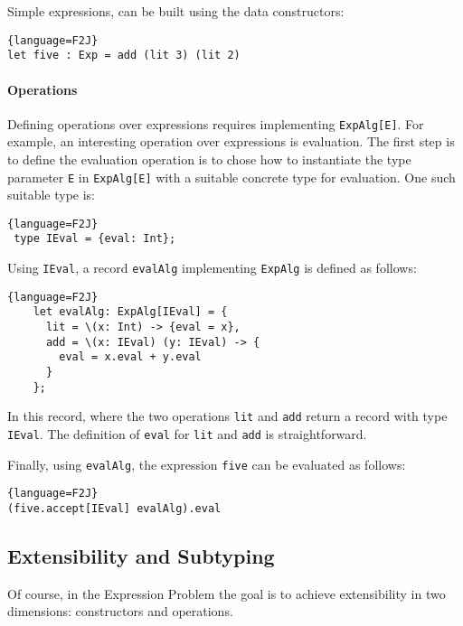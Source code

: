 Simple expressions, can be built using the data constructors:

\begin{lstlisting}{language=F2J}
let five : Exp = add (lit 3) (lit 2)
\end{lstlisting}

\paragraph{Operations} Defining operations over expressions requires
implementing \lstinline{ExpAlg[E]}. For example, an interesting
operation over expressions is evaluation. The first step is to define
the evaluation operation is to chose how to instantiate the type
parameter \lstinline{E} in \lstinline{ExpAlg[E]} with a suitable
concrete type for evaluation. One such suitable type is:

\begin{lstlisting}{language=F2J}
 type IEval = {eval: Int};
\end{lstlisting}

\noindent Using \lstinline{IEval}, a record \lstinline{evalAlg}
implementing \lstinline{ExpAlg} is defined as follows:

\begin{lstlisting}{language=F2J}
    let evalAlg: ExpAlg[IEval] = {
      lit = \(x: Int) -> {eval = x},
      add = \(x: IEval) (y: IEval) -> {
        eval = x.eval + y.eval
      }
    };
\end{lstlisting}

In this record, where the two operations
\lstinline{lit} and \lstinline{add} return a record with type
\lstinline{IEval}. The definition of \lstinline{eval} for
\lstinline{lit} and \lstinline{add} is straightforward. 



Finally, using \lstinline{evalAlg}, the expression \lstinline{five} can 
be evaluated as follows:

\begin{lstlisting}{language=F2J}
(five.accept[IEval] evalAlg).eval
\end{lstlisting}

\subsection{Extensibility and Subtyping} Of course, in the Expression
Problem the goal is to achieve extensibility in two dimensions: constructors and operations.

